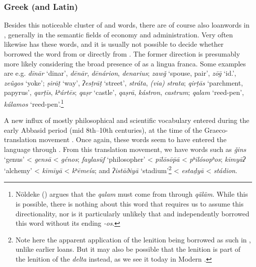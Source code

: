 \documentclass[output=paper]{langsci/langscibook}
\begin{document}
\subsubsection{\label{bkm:Ref13224479}Greek (and Latin)}

Besides this noticeable cluster of  and  words, there are of course also  {loanwords} in , generally in the semantic fields of economy and administration. Very often  likewise has these words, and it is usually not possible to decide whether  borrowed the word from  or directly from . The former direction is presumably more likely considering the broad presence of  as a lingua franca. Some examples are e.g. \textit{dīnār} ‘dinar’,  \textit{dēnār},  \textit{dēnárion},  \textit{denarius}; \textit{zawǧ} ‘spouse, pair’,  \textit{zōḡ} ‘id.’,  \textit{zeûgos} ‘yoke’; \textit{ṣirāṭ} ‘way’,  \textit{ʔesṭrāṭ} ‘street’,  \textit{stráta},  \textit{(via)} \textit{strata}; \textit{qirṭās} ‘parchment, papyrus’,  \textit{qarṭīs},  \textit{kʰártēs}; \textit{qaṣr} ‘castle’,  \textit{qaṣrā},  \textit{kástron},  \textit{castrum}; \textit{qalam} ‘reed-pen’,  \textit{kálamos} ‘reed-pen’.\footnote{Nöldeke (\citeyear[50]{Nöldeke1910}) argues that the  \textit{qalam} must come from  through  \textit{qäläm}. While this is possible, there is nothing about this word that requires us to assume this directionality, nor is it particularly unlikely that  and  independently borrowed this word without its  ending \textit{-os}.}

A new influx of mostly philosophical and scientific  vocabulary entered  during the early Abbasid period (mid 8th–10th centuries), at the time of the Graeco- translation movement \citep{Gutas1998}. Once again, these words seem to have entered the language through  \citep{Gutas2011}. From this translation movement, we have words such as \textit{ǧins} ‘genus’ <  \textit{gensā} <  \textit{génos}; \textit{faylasūf} ‘philosopher’ <  \textit{pīlōsōp̄ā} <  \textit{pʰilósopʰos}; \textit{kīmyāʔ} ‘alchemy’ <  \textit{kīmīyā} <  \textit{kʰēmeía}; and \textit{ʔistāðiyā} ‘stadium’\footnote{Note here the apparent application of the  lenition being borrowed as such in , unlike earlier loans. But it may also be possible that the lenition is part of the  lenition of the \textit{delta} instead, as we see it today in Modern .} <  \textit{estaḏyā} <  \textit{stádion}.
\end{document}

